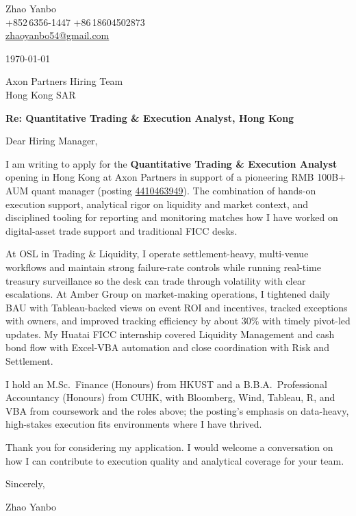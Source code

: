 \documentclass[10pt,a4paper]{article}
\begin{document}
\begin{flushleft}
  Zhao Yanbo\\
  +852\,6356-1447 \;\textbar\; +86\,18604502873\\
  \href{mailto:zhaoyanbo54@gmail.com}{zhaoyanbo54@gmail.com}
\end{flushleft}

\vspace{1em}

\begin{flushright}
  \today
\end{flushright}

\vspace{0.75em}

Axon Partners Hiring Team\\
Hong Kong SAR
\vspace{1em}

\textbf{Re: Quantitative Trading \& Execution Analyst, Hong Kong}
\vspace{0.75em}

Dear Hiring Manager,

I am writing to apply for the \textbf{Quantitative Trading \& Execution Analyst} opening in Hong Kong at Axon Partners in support of a pioneering RMB 100B+ AUM quant manager (posting \href{https://www.linkedin.com/jobs/view/4410463949/}{4410463949}). The combination of hands-on execution support, analytical rigor on liquidity and market context, and disciplined tooling for reporting and monitoring matches how I have worked on digital-asset trade support and traditional FICC desks.

At OSL in Trading \& Liquidity, I operate settlement-heavy, multi-venue workflows and maintain strong failure-rate controls while running real-time treasury surveillance so the desk can trade through volatility with clear escalations. At Amber Group on market-making operations, I tightened daily BAU with Tableau-backed views on event ROI and incentives, tracked exceptions with owners, and improved tracking efficiency by about 30\% with timely pivot-led updates. My Huatai FICC internship covered Liquidity Management and cash bond flow with Excel-VBA automation and close coordination with Risk and Settlement.

I hold an M.Sc.\ Finance (Honours) from HKUST and a B.B.A.\ Professional Accountancy (Honours) from CUHK, with Bloomberg, Wind, Tableau, R, and VBA from coursework and the roles above; the posting’s emphasis on data-heavy, high-stakes execution fits environments where I have thrived.

Thank you for considering my application. I would welcome a conversation on how I can contribute to execution quality and analytical coverage for your team.

\vspace{1em}

Sincerely,

\vspace{2em}

Zhao Yanbo
\end{document}
